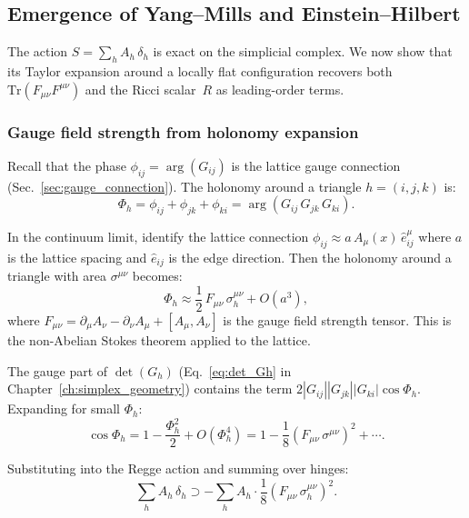 \documentclass[12pt]{article}
\theoremstyle{remark}
\theoremstyle{definition}
\begin{document}
\subsection{Emergence of Yang--Mills and Einstein--Hilbert}
\label{sec:emergence_YM_EH}

The action $S = \sum_h A_h\,\delta_h$ is exact on the simplicial complex.  We now show that its Taylor expansion around a locally flat configuration recovers both $\text{Tr}(F_{\mu\nu}F^{\mu\nu})$ and the Ricci scalar~$R$ as leading-order terms.

\subsubsection{Gauge field strength from holonomy expansion}

Recall that the phase $\phi_{ij} = \arg(G_{ij})$ is the lattice gauge connection (Sec.~\ref{sec:gauge_connection}).  The holonomy around a triangle $h = (i,j,k)$ is:
\begin{equation}
\Phi_h = \phi_{ij} + \phi_{jk} + \phi_{ki} = \arg(G_{ij}\,G_{jk}\,G_{ki}).
\end{equation}

In the continuum limit, identify the lattice connection $\phi_{ij} \approx a\,A_\mu(x)\,\hat{e}^\mu_{ij}$ where $a$ is the lattice spacing and $\hat{e}_{ij}$ is the edge direction.  Then the holonomy around a triangle with area $\sigma^{\mu\nu}$ becomes:
\begin{equation}
\Phi_h \approx \frac{1}{2}\,F_{\mu\nu}\,\sigma^{\mu\nu}_h + O(a^3),
\end{equation}
where $F_{\mu\nu} = \partial_\mu A_\nu - \partial_\nu A_\mu + [A_\mu, A_\nu]$ is the gauge field strength tensor.  This is the non-Abelian Stokes theorem applied to the lattice.

The gauge part of $\det(G_h)$ (Eq.~\ref{eq:det_Gh} in Chapter~\ref{ch:simplex_geometry}) contains the term $2|G_{ij}||G_{jk}||G_{ki}|\cos\Phi_h$.  Expanding for small $\Phi_h$:
\begin{equation}
\cos\Phi_h = 1 - \frac{\Phi_h^2}{2} + O(\Phi_h^4) = 1 - \frac{1}{8}(F_{\mu\nu}\,\sigma^{\mu\nu})^2 + \cdots.
\end{equation}

Substituting into the Regge action and summing over hinges:
\begin{equation}
\sum_h A_h\,\delta_h \supset -\sum_h A_h \cdot \frac{1}{8}(F_{\mu\nu}\,\sigma^{\mu\nu}_h)^2.
\end{equation}
\end{document}
